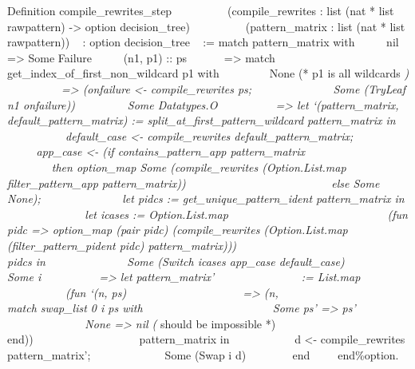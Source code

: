 Definition compile\_rewrites\_step ~ ~ ~ ~ ~ ~(compile\_rewrites : list
(nat * list rawpattern) -\textgreater{} option decision\_tree) ~ ~ ~ ~ ~
~(pattern\_matrix : list (nat * list rawpattern)) ~ : option
decision\_tree ~ := match pattern\_matrix with ~ ~ ~\textbar{} nil
=\textgreater{} Some Failure ~ ~ ~\textbar{} (n1, p1) :: ps ~ ~ ~
~=\textgreater{} match get\_index\_of\_first\_non\_wildcard p1 with ~ ~
~ ~ ~\textbar{} None (* p1 is all wildcards \emph{) ~ ~ ~ ~ ~
~=\textgreater{} (onfailure \textless{}- compile\_rewrites ps; ~ ~ ~ ~ ~
~ ~ ~ Some (TryLeaf n1 onfailure)) ~ ~ ~ ~ ~\textbar{} Some Datatypes.O
~ ~ ~ ~ ~ ~=\textgreater{} let `(pattern\_matrix,
default\_pattern\_matrix) := split\_at\_first\_pattern\_wildcard
pattern\_matrix in ~ ~ ~ ~ ~ ~ ~ default\_case \textless{}-
compile\_rewrites default\_pattern\_matrix; ~ ~ ~ ~ ~ ~ ~ ~ app\_case
\textless{}- (if contains\_pattern\_app pattern\_matrix ~ ~ ~ ~ ~ ~ ~ ~
~ ~ ~ ~ ~ ~ ~then option\_map Some (compile\_rewrites (Option.List.map
filter\_pattern\_app pattern\_matrix)) ~ ~ ~ ~ ~ ~ ~ ~ ~ ~ ~ ~ ~ ~ ~else
Some None); ~ ~ ~ ~ ~ ~ ~ ~ let pidcs := get\_unique\_pattern\_ident
pattern\_matrix in ~ ~ ~ ~ ~ ~ ~ ~ let icases := Option.List.map ~ ~ ~ ~
~ ~ ~ ~ ~ ~ ~ ~ ~ ~ ~ ~ (fun pidc =\textgreater{} option\_map (pair
pidc) (compile\_rewrites (Option.List.map (filter\_pattern\_pident pidc)
pattern\_matrix))) ~ ~ ~ ~ ~ ~ ~ ~ ~ ~ ~ ~ ~ ~ ~ ~ pidcs in ~ ~ ~ ~ ~ ~
~ ~ Some (Switch icases app\_case default\_case) ~ ~ ~ ~ ~\textbar{}
Some i ~ ~ ~ ~ ~ ~=\textgreater{} let pattern\_matrix' ~ ~ ~ ~ ~ ~ ~ ~
~:= List.map ~ ~ ~ ~ ~ ~ ~ ~ ~ ~ ~ (fun `(n, ps) ~ ~ ~ ~ ~ ~ ~ ~ ~ ~ ~
~=\textgreater{} (n, ~ ~ ~ ~ ~ ~ ~ ~ ~ ~ ~ ~ ~ match swap\_list 0 i ps
with ~ ~ ~ ~ ~ ~ ~ ~ ~ ~ ~ ~ ~ \textbar{} Some ps' =\textgreater{} ps' ~
~ ~ ~ ~ ~ ~ ~ ~ ~ ~ ~ ~ \textbar{} None =\textgreater{} nil (} should be
impossible *) ~ ~ ~ ~ ~ ~ ~ ~ ~ ~ ~ ~ ~ end)) ~ ~ ~ ~ ~ ~ ~ ~ ~ ~ ~
pattern\_matrix in ~ ~ ~ ~ ~ ~ ~d \textless{}- compile\_rewrites
pattern\_matrix'; ~ ~ ~ ~ ~ ~ ~ ~Some (Swap i d) ~ ~ ~ ~ ~end ~ ~
~end\%option.
